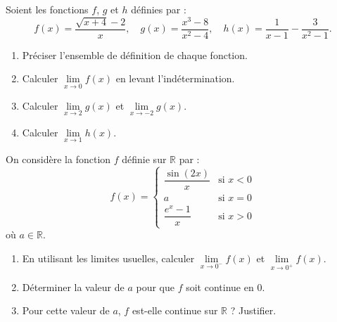 \documentclass[11pt]{article}
\begin{document}
\begin{exercice}
Soient les fonctions $f$, $g$ et $h$ définies par :
\[
f(x) = \frac{\sqrt{x+4} - 2}{x},\quad g(x) = \frac{x^3 - 8}{x^2 - 4},\quad h(x) = \frac{1}{x-1} - \frac{3}{x^2-1}.
\]
\begin{enumerate}
    \item Préciser l'ensemble de définition de chaque fonction.
    \item Calculer $\lim\limits_{x \to 0} f(x)$ en levant l'indétermination.
    \item Calculer $\lim\limits_{x \to 2} g(x)$ et $\lim\limits_{x \to -2} g(x)$.
    \item Calculer $\lim\limits_{x \to 1} h(x)$.
\end{enumerate}
\end{exercice}

\begin{exercice}
On considère la fonction $f$ définie sur $\mathbb{R}$ par :
\[
f(x) = \begin{cases}
\dfrac{\sin(2x)}{x} & \text{si } x < 0 \\[1em]
a & \text{si } x = 0 \\[0.5em]
\dfrac{e^{x} - 1}{x} & \text{si } x > 0
\end{cases}
\]
où $a \in \mathbb{R}$.
\begin{enumerate}
    \item En utilisant les limites usuelles, calculer $\lim\limits_{x \to 0^-} f(x)$ et $\lim\limits_{x \to 0^+} f(x)$.
    \item Déterminer la valeur de $a$ pour que $f$ soit continue en $0$.
    \item Pour cette valeur de $a$, $f$ est-elle continue sur $\mathbb{R}$ ? Justifier.
\end{enumerate}
\end{exercice}
\end{document}
